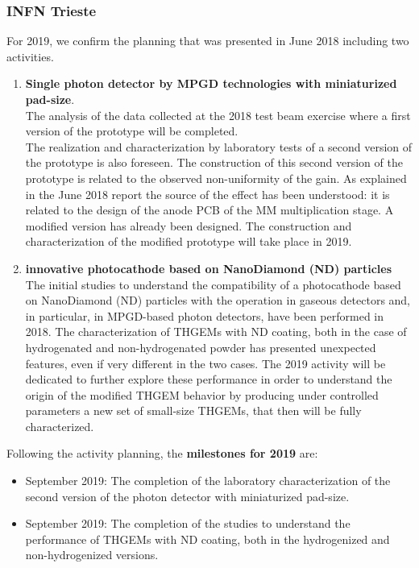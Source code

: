  \subsubsection{INFN Trieste} 
 \label{sec:infn-planned-next}
For 2019, we confirm the planning that was presented in
June 2018 including two activities.
\begin{enumerate}
\item
\textbf{Single photon detector 
by MPGD technologies with 
miniaturized 
pad-size}. \\
The analysis of the data collected at the 2018 
test beam exercise where a first version of the 
prototype will be completed.\\
The realization and characterization by laboratory 
tests of a
second version of the prototype is also foreseen. 
The construction of this second version of the
prototype is 
related to the observed non-uniformity of the gain. 
As explained in the June 2018 report
the source of the effect has been understood:
it is related to the design of the anode PCB 
of the MM multiplication
stage. A modified version has already been designed. 
The construction and characterization 
of the modified prototype
will take place in 2019.
\item
\textbf{innovative photocathode 
based on NanoDiamond (ND) particles} \\
The initial studies to understand the 
compatibility of a photocathode 
based on NanoDiamond (ND) particles with the 
operation in gaseous detectors and, in 
particular, in MPGD-based photon detectors, 
have been performed in 2018. The characterization of
THGEMs with ND 
coating, both in the case of hydrogenated and
non-hydrogenated powder has presented unexpected
features, even if 
very different in the two cases.
The 2019 activity will be dedicated to further 
explore these 
performance in order to understand the origin of the
modified
THGEM behavior by producing under 
controlled parameters       a new set 
of small-size THGEMs, 
that then will be fully characterized.
\end{enumerate}
\par
Following the activity planning, the 
\textbf{milestones for 2019} are:
\begin{itemize}
\item
September 2019: The completion of the laboratory characterization 
of the second version of the photon detector with miniaturized pad-size.
\item
September 2019: The completion of the studies to understand the performance of THGEMs with ND coating, both in the hydrogenized and non-hydrogenized versions.
\end{itemize}